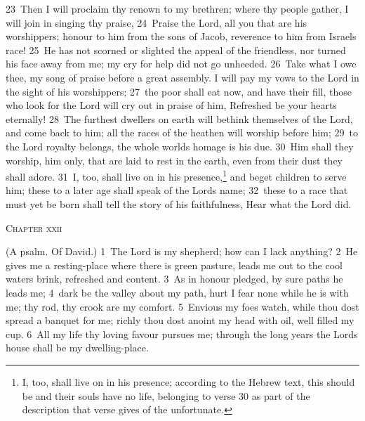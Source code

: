 \documentclass[10pt]{book} %
\begin{document}
\textcolor{benred8}{23}~Then I will proclaim thy renown to my brethren; where thy people gather, I will join in singing thy praise, \textcolor{benred8}{24}~Praise the Lord, all you that are his worshippers; honour to him from the sons of Jacob, reverence to him from Israel\textquotesingle s race! \textcolor{benred8}{25}~He has not scorned or slighted the appeal of the friendless, nor turned his face away from me; my cry for help did not go unheeded. \textcolor{benred8}{26}~Take what I owe thee, my song of praise before a great assembly. I will pay my vows to the Lord in the sight of his worshippers; \textcolor{benred8}{27}~the poor shall eat now, and have their fill, those who look for the Lord will cry out in praise of him, Refreshed be your hearts eternally! \textcolor{benred8}{28}~The furthest dwellers on earth will bethink themselves of the Lord, and come back to him; all the races of the heathen will worship before him; \textcolor{benred8}{29}~to the Lord royalty belongs, the whole world\textquotesingle s homage is his due. \textcolor{benred8}{30}~Him shall they worship, him only, that are laid to rest in the earth, even from their dust they shall adore. \textcolor{benred8}{31}~I, too, shall live on in his presence,\footnote[2]{\textasciigrave I, too, shall live on in his presence\textquotesingle ; according to the Hebrew text, this should be \textasciigrave and their souls have no life\textquotesingle , belonging to verse 30 as part of the description that verse gives of the unfortunate.} and beget children to serve him; these to a later age shall speak of the Lord\textquotesingle s name; \textcolor{benred8}{32}~these to a race that must yet be born shall tell the story of his faithfulness, Hear what the Lord did.
\begin{large}\begin{center}\textsc{Chapter xxii}\end{center}\end{large}
(A psalm. Of David.)
\textcolor{benred8}{1}~The Lord is my shepherd; how can I lack anything? \textcolor{benred8}{2}~He gives me a resting-place where there is green pasture, leads me out to the cool water\textquotesingle s brink, refreshed and content. \textcolor{benred8}{3}~As in honour pledged, by sure paths he leads me; \textcolor{benred8}{4}~dark be the valley about my path, hurt I fear none while he is with me; thy rod, thy crook are my comfort. \textcolor{benred8}{5}~Envious my foes watch, while thou dost spread a banquet for me; richly thou dost anoint my head with oil, well filled my cup. \textcolor{benred8}{6}~All my life thy loving favour pursues me; through the long years the Lord\textquotesingle s house shall be my dwelling-place.
\end{document}

